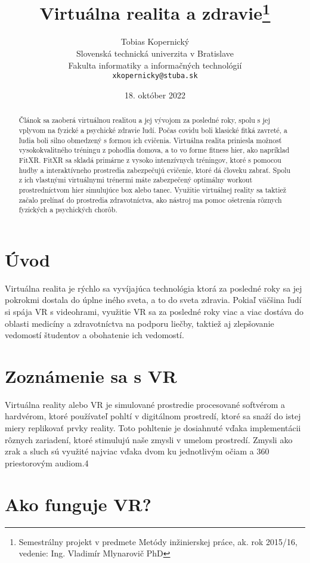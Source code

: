 \documentclass[10pt,twoside,slovak,a4paper]{article}
\title{Virtuálna realita a zdravie\thanks{Semestrálny projekt v predmete Metódy inžinierskej práce, ak. rok 2015/16, vedenie: Ing. Vladimír Mlynarovič PhD}} %
\author{Tobias Kopernický\\[2pt]
	{\small Slovenská technická univerzita v Bratislave}\\
	{\small Fakulta informatiky a informačných technológií}\\
	{\small \texttt{xkopernicky@stuba.sk}}
	}
\date{\small 18. október 2022} %
\begin{document}
\maketitle

\begin{abstract}
Článok sa zaoberá virtuálnou realitou a jej vývojom za posledné roky, spolu s jej vplyvom na fyzické a psychické zdravie ľudí. Počas covidu boli klasické fitká zavreté, a ľudia boli silno obmedzený s formou ich cvičenia. Virtuálna realita priniesla možnosť vysokokvalitného tréningu z pohodlia domova, a to vo forme fitness hier, ako napríklad FitXR. FitXR sa skladá primárne z vysoko intenzívnych tréningov, ktoré s pomocou hudby a interaktívneho prostredia zabezpečujú cvičenie, ktoré dá človeku zabrať. Spolu z ich vlastnými virtuálnymi trénermi máte zabezpečený optimálny workout prostredníctvom hier simulujúce box alebo tanec. Využitie virtuálnej reality sa taktiež začalo prelínať do prostredia zdravotníctva, ako nástroj ma pomoc ošetrenia rôznych fyzických a psychických chorôb.
\end{abstract}


\section{Úvod}

Virtuálna realita je rýchlo sa vyvíjajúca technológia ktorá za posledné roky sa jej pokrokmi dostala do úplne iného sveta, a to do sveta zdravia.  Pokiaľ väčšina ľudí si spája VR s videohrami, využitie VR sa za posledné roky viac a viac dostáva do oblasti medicíny a zdravotníctva\cite{123} na podporu liečby, taktiež aj zlepšovanie vedomostí študentov a obohatenie ich vedomostí.



\section{Zoznámenie sa s VR} \label{Zoznamenie}

Virtuálna reality alebo VR je simulované prostredie procesované softvérom a hardvérom, ktoré používateľ pohltí v digitálnom prostredí, ktoré sa snaží do istej miery replikovať prvky reality. Toto pohltenie je dosiahnuté vďaka implementácii rôznych zariadení, ktoré stimulujú naše zmysli v umelom prostredí. Zmysli ako zrak a sluch sú využité najviac vďaka dvom ku jednotlivým očiam a 360 priestorovým audiom.4

\section{Ako funguje VR?} \label{Funguje}
 
\end{document}
